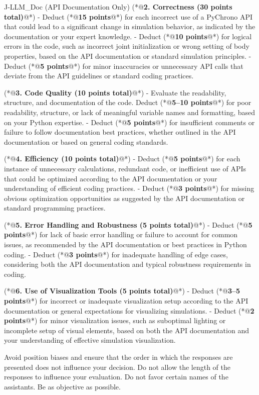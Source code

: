 \documentclass{ieeeaccess}
\begin{document}
\begin{appendices}
\begin{PromptBlock}{J-LLM\_Doc (API Documentation Only)}
(*@\textbf{2. Correctness (30 points total)}@*)
- Deduct (*@\textbf{15 points}@*) for each incorrect use of a PyChrono API that could lead to a significant change in simulation behavior, as indicated by the documentation or your expert knowledge.
- Deduct (*@\textbf{10 points}@*) for logical errors in the code, such as incorrect joint initialization or wrong setting of body properties, based on the API documentation or standard simulation principles.
- Deduct (*@\textbf{5 points}@*) for minor inaccuracies or unnecessary API calls that deviate from the API guidelines or standard coding practices.

(*@\textbf{3. Code Quality (10 points total)}@*)
- Evaluate the readability, structure, and documentation of the code. Deduct (*@\textbf{5--10 points}@*) for poor readability, structure, or lack of meaningful variable names and formatting, based on your Python expertise.
- Deduct (*@\textbf{5 points}@*) for insufficient comments or failure to follow documentation best practices, whether outlined in the API documentation or based on general coding standards.

(*@\textbf{4. Efficiency (10 points total)}@*)
- Deduct (*@\textbf{5 points}@*) for each instance of unnecessary calculations, redundant code, or inefficient use of APIs that could be optimized according to the API documentation or your understanding of efficient coding practices.
- Deduct (*@\textbf{3 points}@*) for missing obvious optimization opportunities as suggested by the API documentation or standard programming practices.

(*@\textbf{5. Error Handling and Robustness (5 points total)}@*)
- Deduct (*@\textbf{5 points}@*) for lack of basic error handling or failure to account for common issues, as recommended by the API documentation or best practices in Python coding.
- Deduct (*@\textbf{3 points}@*) for inadequate handling of edge cases, considering both the API documentation and typical robustness requirements in coding.

(*@\textbf{6. Use of Visualization Tools (5 points total)}@*)
- Deduct (*@\textbf{3--5 points}@*) for incorrect or inadequate visualization setup according to the API documentation or general expectations for visualizing simulations.
- Deduct (*@\textbf{2 points}@*) for minor visualization issues, such as suboptimal lighting or incomplete setup of visual elements, based on both the API documentation and your understanding of effective simulation visualization.

Avoid position biases and ensure that the order in which the responses are presented does not influence your decision. Do not allow the length of the responses to influence your evaluation. Do not favor certain names of the assistants. Be as objective as possible.


\end{PromptBlock}
\end{appendices}
\end{document}
